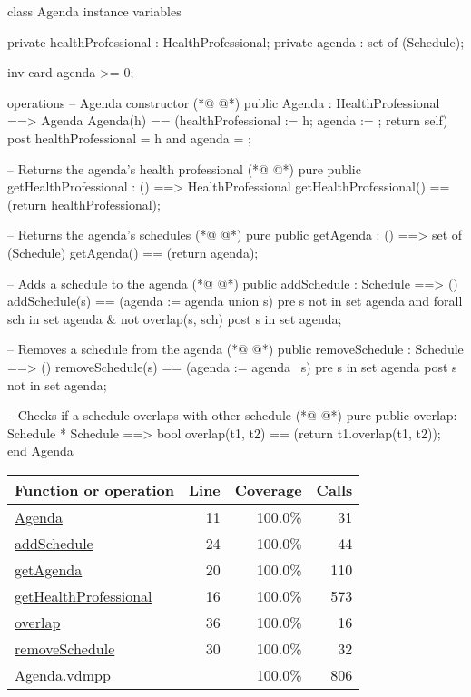 \begin{vdmpp}[breaklines=true]
class Agenda
instance variables

private healthProfessional : HealthProfessional;
private agenda : set of (Schedule);

inv card agenda >= 0;

operations
 -- Agenda constructor
(*@
\label{Agenda:11}
@*)
 public Agenda : HealthProfessional ==> Agenda
  Agenda(h) == (healthProfessional := h; agenda := {}; return self)
 post healthProfessional = h and agenda = {};
 
 -- Returns the agenda's health professional
(*@
\label{getHealthProfessional:16}
@*)
 pure public getHealthProfessional : () ==> HealthProfessional
  getHealthProfessional() == (return healthProfessional);
 
 -- Returns the agenda's schedules
(*@
\label{getAgenda:20}
@*)
 pure public getAgenda : () ==> set of (Schedule)
  getAgenda() == (return agenda);
 
 -- Adds a schedule to the agenda
(*@
\label{addSchedule:24}
@*)
 public addSchedule : Schedule ==> ()
  addSchedule(s) == (agenda := agenda union {s})
 pre s not in set agenda and forall sch in set agenda & not overlap(s, sch)
 post s in set agenda;
 
 -- Removes a schedule from the agenda
(*@
\label{removeSchedule:30}
@*)
 public removeSchedule : Schedule ==> ()
  removeSchedule(s) == (agenda := agenda \ {s})
 pre s in set agenda
 post s not in set agenda;
 
 -- Checks if a schedule overlaps with other schedule
(*@
\label{overlap:36}
@*)
 pure public overlap: Schedule * Schedule ==> bool
  overlap(t1, t2) == (return t1.overlap(t1, t2));
end Agenda
\end{vdmpp}
\bigskip
\begin{longtable}{|l|r|r|r|}
\hline
Function or operation & Line & Coverage & Calls \\
\hline
\hline
\hyperref[Agenda:11]{Agenda} & 11&100.0\% & 31 \\
\hline
\hyperref[addSchedule:24]{addSchedule} & 24&100.0\% & 44 \\
\hline
\hyperref[getAgenda:20]{getAgenda} & 20&100.0\% & 110 \\
\hline
\hyperref[getHealthProfessional:16]{getHealthProfessional} & 16&100.0\% & 573 \\
\hline
\hyperref[overlap:36]{overlap} & 36&100.0\% & 16 \\
\hline
\hyperref[removeSchedule:30]{removeSchedule} & 30&100.0\% & 32 \\
\hline
\hline
Agenda.vdmpp & & 100.0\% & 806 \\
\hline
\end{longtable}

